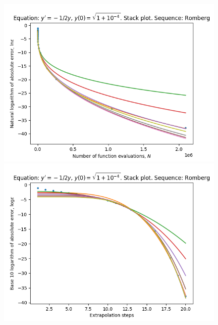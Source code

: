 \begin{figure}[H]
\centering
\begin{minipage}{0.45\textwidth}
\centering
\includegraphics[scale=0.45]{../results/emr_plots/quad_sing_4_hp_romberg_stack.png}
\end{minipage}
\begin{minipage}{0.45\textwidth}
\centering
\includegraphics[scale=0.45]{../results/emr_plots/quad_sing_4_hp_romberg_steps_stack.png}
\end{minipage}
\end{figure}


